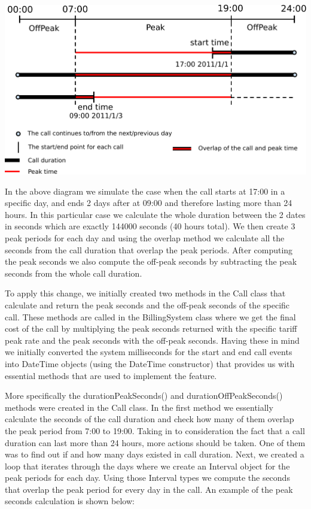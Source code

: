 \documentclass[pdftex,11pt,a4paper]{article}
\begin{document}
\begin{center}
	\includegraphics[scale=0.67]{images/timeline.pdf}
\end{center}

In the above diagram we simulate the case when the call starts at 17:00 in a specific day, and ends 2 days after at 09:00 and therefore lasting more than 24 hours. In this particular case we calculate the whole duration between the 2 dates in seconds which are exactly 144000 seconds (40 hours total). We then create 3 peak periods for each day and using the overlap method we calculate all the seconds from the call duration that overlap the peak periods. After computing the peak seconds we also compute the off-peak seconds by subtracting the peak seconds from the whole call duration.

To apply this change, we initially created two methods in the Call class that calculate and return the peak seconds and the off-peak seconds of the specific call. These methods are called in the BillingSystem class where we get the final cost of the call by multiplying the peak seconds returned with the specific tariff peak rate and the peak seconds with the off-peak seconds. Having these in mind we initially converted the system milliseconds for the start and end call events into DateTime objects (using the DateTime constructor) that provides us with essential methods that are used to implement the feature.

More specifically the durationPeakSeconds() and  durationOffPeakSeconds() methods were created in the Call class. In the first method we essentially calculate the seconds of the call duration and check how many of them overlap the peak period from 7:00 to 19:00. Taking in to consideration the fact that a call duration can last more than 24 hours, more actions should be taken. One of them was to find out if and how many days existed in call duration. Next, we created a loop that iterates through the days where we create an Interval object for the peak periods for each day. Using those Interval types we compute the seconds that overlap the peak period for every day in the call. An example of the peak seconds calculation is shown below:
\end{document}
